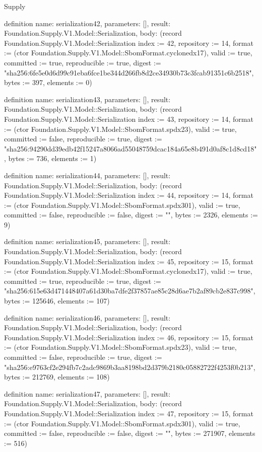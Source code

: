 \begin{lexlean}{Supply}
\begin{semanticmodule}
definition{
  name: serialization42,
  parameters: [],
  result: Foundation.Supply.V1.Model::Serialization,
  body: (record Foundation.Supply.V1.Model::Serialization {index := 42, repository := 14, format := (ctor Foundation.Supply.V1.Model::SbomFormat.cyclonedx17), valid := true, committed := true, reproducible := true, digest := "sha256:6fe5e0d6d99c91eba6fce1be344d266fb8d2ce34930b73c3fcab91351c6b2518", bytes := 397, elements := 0})
}

definition{
  name: serialization43,
  parameters: [],
  result: Foundation.Supply.V1.Model::Serialization,
  body: (record Foundation.Supply.V1.Model::Serialization {index := 43, repository := 14, format := (ctor Foundation.Supply.V1.Model::SbomFormat.spdx23), valid := true, committed := false, reproducible := true, digest := "sha256:94290dd39edb42f15247a8066ad55048759dcac184a65e8b491d0af8c1d8cd18", bytes := 736, elements := 1})
}

definition{
  name: serialization44,
  parameters: [],
  result: Foundation.Supply.V1.Model::Serialization,
  body: (record Foundation.Supply.V1.Model::Serialization {index := 44, repository := 14, format := (ctor Foundation.Supply.V1.Model::SbomFormat.spdx301), valid := true, committed := false, reproducible := false, digest := "", bytes := 2326, elements := 9})
}

definition{
  name: serialization45,
  parameters: [],
  result: Foundation.Supply.V1.Model::Serialization,
  body: (record Foundation.Supply.V1.Model::Serialization {index := 45, repository := 15, format := (ctor Foundation.Supply.V1.Model::SbomFormat.cyclonedx17), valid := true, committed := true, reproducible := true, digest := "sha256:615e63d471448407a61d30ba7dfe2f37857ae85c28d6ae7b2af89cb2e837c998", bytes := 125646, elements := 107})
}

definition{
  name: serialization46,
  parameters: [],
  result: Foundation.Supply.V1.Model::Serialization,
  body: (record Foundation.Supply.V1.Model::Serialization {index := 46, repository := 15, format := (ctor Foundation.Supply.V1.Model::SbomFormat.spdx23), valid := true, committed := false, reproducible := true, digest := "sha256:e9763cf2e294fb7c2adc9869b3aa8198bd2d379b2180c05882722f4253f0b213", bytes := 212769, elements := 108})
}

definition{
  name: serialization47,
  parameters: [],
  result: Foundation.Supply.V1.Model::Serialization,
  body: (record Foundation.Supply.V1.Model::Serialization {index := 47, repository := 15, format := (ctor Foundation.Supply.V1.Model::SbomFormat.spdx301), valid := true, committed := false, reproducible := false, digest := "", bytes := 271907, elements := 516})
}


\end{semanticmodule}
\end{lexlean}
